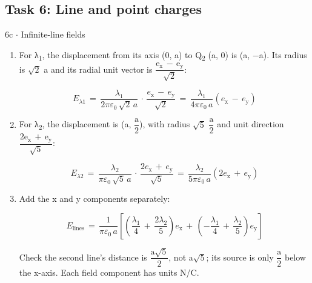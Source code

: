 \documentclass[11pt]{article}
\begin{document}
\begin{keepsection}\subsection{Task 6: Line and point charges}

\begin{workedbox}{6c \ensuremath{\cdot} Infinite-line fields}
\begin{enumerate}
\item {}
For λ\textsubscript{1}, the displacement from its axis (0, a) to Q\textsubscript{2} (a, 0) is (a, \ensuremath{-}a). Its radius is \ensuremath{\sqrt{2}} a and its radial unit vector is {\small\ensuremath{\dfrac{\mathrm{e}_{\mathrm{x}}\, -\, \mathrm{e}_{\mathrm{y}}}{\sqrt{2}}}}:

\begin{equation*}{E}_{λ1}\, =\, \dfrac{λ_{1}}{2πε_{0}\, \sqrt{2}\, {a}}\, \cdot \, \dfrac{{e}_{\mathrm{x}}\, -\, {e}_{\mathrm{y}}}{\sqrt{2}}\, =\, \dfrac{λ_{1}}{4πε_{0}\, {a}}({e}_{\mathrm{x}}\, -\, {e}_{\mathrm{y}})\end{equation*}
\item {}
For λ\textsubscript{2}, the displacement is (a, {\small\ensuremath{\dfrac{\mathrm{a}}{2}}}), with radius \ensuremath{\sqrt{5}} {\small\ensuremath{\dfrac{\mathrm{a}}{2}}} and unit direction {\small\ensuremath{\dfrac{2\mathrm{e}_{\mathrm{x}}\, +\, \mathrm{e}_{\mathrm{y}}}{\sqrt{5}}}}:

\begin{equation*}{E}_{λ2}\, =\, \dfrac{λ_{2}}{πε_{0}\, \sqrt{5}\, {a}}\, \cdot \, \dfrac{2{e}_{\mathrm{x}}\, +\, {e}_{\mathrm{y}}}{\sqrt{5}}\, =\, \dfrac{λ_{2}}{5πε_{0}\, {a}}(2{e}_{\mathrm{x}}\, +\, {e}_{\mathrm{y}})\end{equation*}
\item {}
Add the x and y components separately:

\begin{equation*}{E}_{\text{lines}}\, =\, \dfrac{1}{πε_{0}\, {a}}\left[\left(\dfrac{λ_{1}}{4}\, +\, \dfrac{2λ_{2}}{5}\right){e}_{\mathrm{x}}\, +\, \left(-\dfrac{λ_{1}}{4}\, +\, \dfrac{λ_{2}}{5}\right){e}_{\mathrm{y}}\right]\end{equation*}

Check the second line’s distance is {\small\ensuremath{\dfrac{\mathrm{a}\sqrt{5}}{2}}}, not a\ensuremath{\sqrt{5}}; its source is only {\small\ensuremath{\dfrac{\mathrm{a}}{2}}} below the x-axis. Each field component has units N/C.
\end{enumerate}
\end{workedbox}

\end{keepsection}
\end{document}
